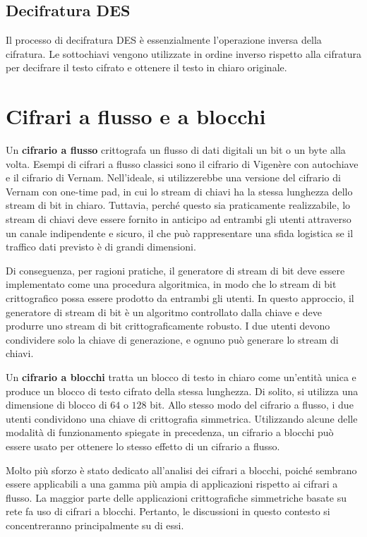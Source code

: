 \subsection{Decifratura DES}
Il processo di decifratura DES è essenzialmente l'operazione inversa della
cifratura. Le sottochiavi vengono utilizzate in ordine inverso rispetto alla
cifratura per decifrare il testo cifrato e ottenere il testo in chiaro originale.
\section{Cifrari a flusso e a blocchi}
Un \textbf{cifrario a flusso} crittografa un flusso di dati digitali un bit
o un byte alla volta. Esempi di cifrari a flusso classici sono il
cifrario di Vigenère con autochiave e il cifrario di Vernam. Nell'ideale,
si utilizzerebbe una versione del cifrario di Vernam con one-time pad, in
cui lo stream di chiavi ha la stessa lunghezza dello stream di bit in chiaro.
Tuttavia, perché questo sia praticamente realizzabile, lo stream di chiavi deve
essere fornito in anticipo ad entrambi gli utenti attraverso un canale indipendente
e sicuro, il che può rappresentare una sfida logistica se il traffico dati
previsto è di grandi dimensioni.

Di conseguenza, per ragioni pratiche, il generatore di stream di bit deve
essere implementato come una procedura algoritmica, in modo che lo stream di
bit crittografico possa essere prodotto da entrambi gli utenti. In questo
approccio, il generatore di stream di bit è un algoritmo controllato dalla chiave
e deve produrre uno stream di bit crittograficamente robusto. I due utenti devono
condividere solo la chiave di generazione, e ognuno può generare lo stream di chiavi.

Un \textbf{cifrario a blocchi} tratta un blocco di testo in chiaro come un'entità
unica e produce un blocco di testo cifrato della stessa lunghezza. Di solito,
si utilizza una dimensione di blocco di $64$ o $128$ bit. Allo stesso modo del 
cifrario a flusso, i due utenti condividono una chiave di crittografia simmetrica.
Utilizzando alcune delle modalità di funzionamento spiegate in precedenza, un
cifrario a blocchi può essere usato per ottenere lo stesso effetto di un cifrario
a flusso.

Molto più sforzo è stato dedicato all'analisi dei cifrari a blocchi, poiché
sembrano essere applicabili a una gamma più ampia di applicazioni rispetto ai
cifrari a flusso. La maggior parte delle applicazioni crittografiche simmetriche
basate su rete fa uso di cifrari a blocchi. Pertanto, le discussioni in questo
contesto si concentreranno principalmente su di essi.

